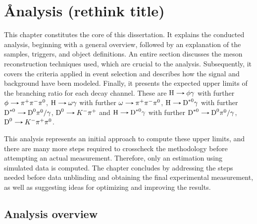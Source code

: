 \chapter[Analysis]{\r Analysis (rethink title)}\label{chap:analysis}

This chapter constitutes the core of this dissertation. It explains the conducted analysis, beginning with a general overview, followed by an explanation of the samples, triggers, and object definitions. An entire section discusses the meson reconstruction techniques used, which are crucial to the analysis. Subsequently, it covers the criteria applied in event selection and describes how the signal and background have been modeled. Finally, it presents the expected upper limits of the branching ratio for each decay channel. These are $\text{H}\decaysto \phi\gamma$ with further $\phi\decaysto \pi^+\pi^-\pi^0$, $\text{H}\decaysto \omega\gamma$ with further $\omega\decaysto \pi^+\pi^-\pi^0$, $\text{H}\decaysto \text{D}^{*0}\gamma$ with further $\text{D}^{*0}\decaysto \text{D}^{0}\pi^{0}/\gamma$, $\text{D}^{0}\decaysto K^{-}\pi^{+}$ and $\text{H}\decaysto \text{D}^{*0}\gamma$ with further $\text{D}^{*0}\decaysto \text{D}^{0}\pi^{0}/\gamma$, $\text{D}^{0}\decaysto K^{-}\pi^{+}\pi^{0}$.

This analysis represents an initial approach to compute these upper limits, and there are many more steps required to crosscheck the methodology before attempting an actual measurement. Therefore, only an estimation using simulated data is computed. The chapter concludes by addressing the steps needed before data unblinding and obtaining the final experimental measurement, as well as suggesting ideas for optimizing and improving the results.

\section{Analysis overview}\label{sec:analysis_overview}

